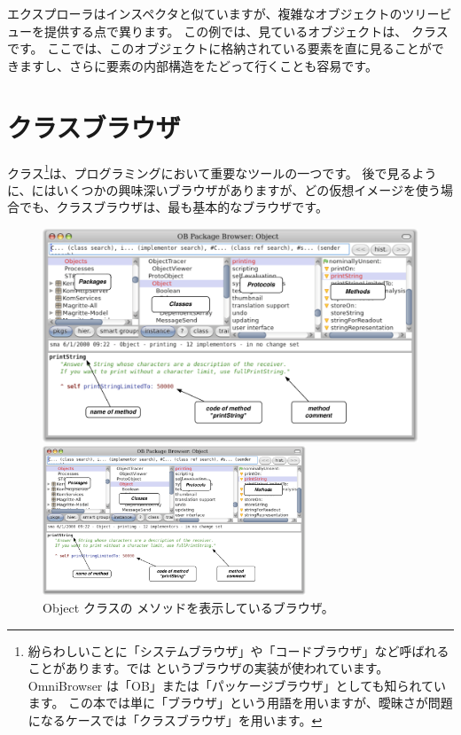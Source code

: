 \documentclass[a4paper,10pt,twoside]{book}
\begin{document}
エクスプローラはインスペクタと似ていますが、複雑なオブジェクトのツリービューを提供する点で異ります。
この例では、見ているオブジェクトは、 クラスです。
ここでは、このオブジェクトに格納されている要素を直に見ることができますし、さらに要素の内部構造をたどって行くことも容易です。

\section{クラスブラウザ}

クラス\footnote{紛らわしいことに「システムブラウザ」や「コードブラウザ」など呼ばれることがあります。\pharo では  というブラウザの実装が使われています。OmniBrowser は「OB」または「パッケージブラウザ」としても知られています。
この本では単に「ブラウザ」という用語を用いますが、曖昧さが問題になるケースでは「クラスブラウザ」を用います。}は、プログラミングにおいて重要なツールの一つです。
後で見るように、\pharo にはいくつかの興味深いブラウザがありますが、どの仮想イメージを使う場合でも、クラスブラウザは、最も基本的なブラウザです。


\begin{figure}[htb]
\ifluluelse
	{\centerline {\includegraphics[width=\textwidth]{ClassBrowser1}}}
	{\centerline {\includegraphics[width=0.7\textwidth]{ClassBrowser1}}}
\caption{Object クラスの  メソッドを表示しているブラウザ。
}
\end{figure}
\end{document}
